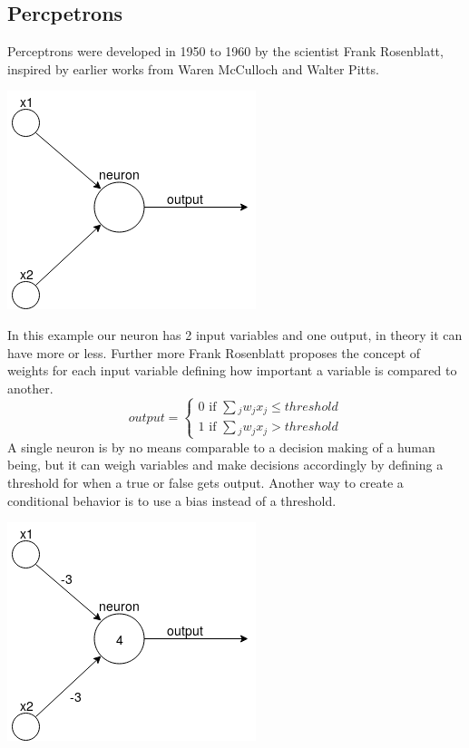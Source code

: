 \subsection{Percpetrons}
Perceptrons were developed in 1950 to 1960 by the scientist Frank Rosenblatt, inspired by earlier works from Waren McCulloch and Walter
Pitts. \cite{neuralnetworksanddeeplearning}
\begin{center}
    \includegraphics[scale=0.5]{images/neurons/simple_neuron.png}
\end{center}
In this example our neuron has 2 input variables and one output, in theory it can have more or less. Further more Frank Rosenblatt proposes
the concept of weights for each input variable defining how important a variable is compared to another.\\
\vspace{0.5cm}
    \begin{equation*}
        output=
        \begin{cases}
            0 \text{ if } \sum{_j}{w_jx_j \le threshold}\\
            1 \text{ if } \sum{_j}{w_jx_j > threshold}
        \end{cases}
    \end{equation*}
\vspace{0.5cm}
A single neuron is by no means comparable to a decision making of a human being, but it can weigh variables and make decisions
accordingly by defining a threshold for when a true or false gets output. Another way to create a conditional behavior is to use a bias
instead of a threshold.
\begin{center}
    \includegraphics[scale=0.5]{images/neurons/simple_neuron_bias.png}
\end{center}

